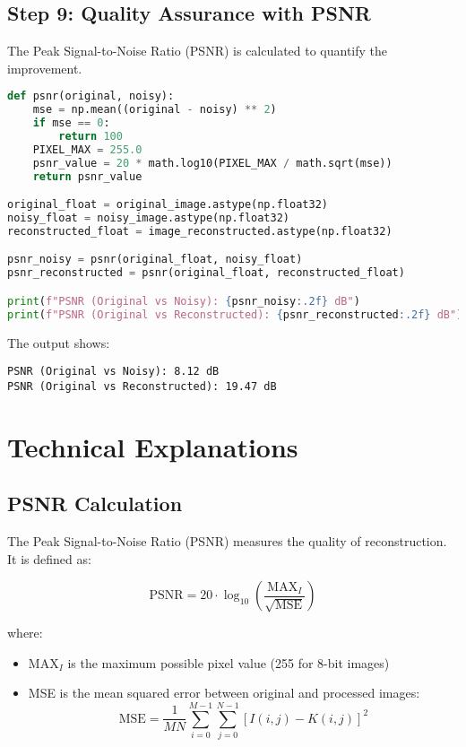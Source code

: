 \documentclass[12pt]{article}
\begin{document}
\subsection{Step 9: Quality Assurance with PSNR}
The Peak Signal-to-Noise Ratio (PSNR) is calculated to quantify the improvement.

\begin{lstlisting}[language=Python]
def psnr(original, noisy):
    mse = np.mean((original - noisy) ** 2)
    if mse == 0:
        return 100
    PIXEL_MAX = 255.0
    psnr_value = 20 * math.log10(PIXEL_MAX / math.sqrt(mse))
    return psnr_value

original_float = original_image.astype(np.float32)
noisy_float = noisy_image.astype(np.float32)
reconstructed_float = image_reconstructed.astype(np.float32)

psnr_noisy = psnr(original_float, noisy_float)
psnr_reconstructed = psnr(original_float, reconstructed_float)

print(f"PSNR (Original vs Noisy): {psnr_noisy:.2f} dB")
print(f"PSNR (Original vs Reconstructed): {psnr_reconstructed:.2f} dB")
\end{lstlisting}

The output shows:
\begin{verbatim}
PSNR (Original vs Noisy): 8.12 dB
PSNR (Original vs Reconstructed): 19.47 dB
\end{verbatim}

\section{Technical Explanations}

\subsection{PSNR Calculation}
The Peak Signal-to-Noise Ratio (PSNR) measures the quality of reconstruction. It is defined as:

\[
\text{PSNR} = 20 \cdot \log_{10}\left(\frac{\text{MAX}_I}{\sqrt{\text{MSE}}}\right)
\]

where:
\begin{itemize}
    \item $\text{MAX}_I$ is the maximum possible pixel value (255 for 8-bit images)
    \item MSE is the mean squared error between original and processed images:
    \[
    \text{MSE} = \frac{1}{MN}\sum_{i=0}^{M-1}\sum_{j=0}^{N-1}[I(i,j)-K(i,j)]^2
    \]
\end{itemize}
\end{document}
